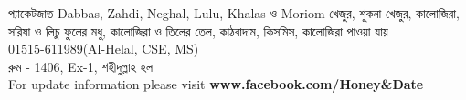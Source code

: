 \documentclass{article}
\begin{document}
\centering
{}
{{\fontsize{44}{52.8} \selectfont প্যাকেটজাত  Dabbas, Zahdi, Neghal, Lulu, Khalas  ও Moriom খেজুর, শুকনা খেজুর, কালোজিরা, সরিষা ও  লিচু ফুলের মধু, কালোজিরা ও তিলের তেল, কাঠবাদাম, কিসমিস, কালোজিরা পাওয়া যায়\\}{\fontsize{36}{43.2}\selectfont {}01515-611989(Al-Helal, CSE, MS)\\  রুম - 1406, Ex-1, শহীদুল্লাহ হল\\} {\fontsize{20}{24} \selectfont {} For update information please visit \textbf{www.facebook.com/Honey\&Date}\\}\vspace{1.5cm}}
\end{document}
